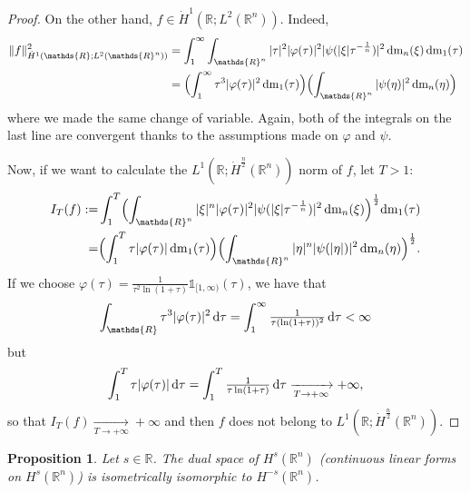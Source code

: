\documentclass[a4paper, 12pt]{article}
\theoremstyle{plain}
\newtheorem{proposition}{Proposition}[section]
\theoremstyle{definition}
\theoremstyle{remark}
\numberwithin{equation}{section}
\begin{document}
\begin{proof}
\noindent
On the other hand, $f\in \dot H^1({\mathds{R}};L^2({\mathds{R}}^n))$. Indeed,
%
\begin{align*}
\|f\|_{\dot H^1({\mathds{R}};L^2({\mathds{R}}^n))}^2&=
\int_1^\infty \int_{{\mathds{R}}^n} |\tau|^2|\varphi(\tau)|^2|\psi(|\xi|\tau^{-\frac{1}{n}})|^2\,{\rm dm}_n(\xi)\,{\rm dm}_1(\tau)\\
&=\Bigl(\int_1^\infty \tau^3 |\varphi(\tau)|^2\,{\rm dm}_1(\tau)\Bigr)\Bigl( \int_{{\mathds{R}}^n} |\psi(\eta)|^2\,{\rm dm}_n(\eta)\Bigr)
\end{align*}
% 
where we made the same change of variable. Again, both of the integrals on the last line are convergent thanks to the assumptions
made on $\varphi$ and $\psi$.

\noindent
Now, if we want to calculate the $L^1({\mathds{R}};\dot H^{\frac{n}{2}}({\mathds{R}}^n))$ norm of $f$, let $T>1$:
%
\begin{align*}
I_T(f):=&\int_1^T \Bigl(\int_{{\mathds{R}}^n}|\xi|^{n}|\varphi(\tau)|^2|\psi(|\xi|\tau^{-\frac{1}{n}})|^2\,{\rm dm}_n(\xi)\Bigr)^{\frac{1}{2}}{\rm dm}_1(\tau)\\
=&\Bigl(\int_1^T \tau|\varphi(\tau)|\,{\rm dm}_1(\tau)\Bigr)
\Bigl(\int_{{\mathds{R}}^n}|\eta|^{n}|\psi(|\eta|)|^2\,{\rm dm}_n(\eta)\Bigr)^{\frac{1}{2}}.
\end{align*}
%
If we choose $\varphi(\tau)=\frac{1}{\tau^2\ln(1+\tau)}{\mathds{1}}_{[1,\infty)}(\tau)$, we have that 
\[
\int_{{\mathds{R}}} \tau^3|\varphi(\tau)|^2\,{\rm d}\tau =\int_1^\infty \tfrac{1}{\tau (\ln(1+\tau))^2}\, {\rm d}\tau<\infty
\]
but
\[
\int_1^T \tau |\varphi(\tau)|\,{\rm d}\tau =\int_1^T\tfrac{1}{\tau \ln(1+\tau)}\,{\rm d}\tau\xrightarrow[T\to+\infty]{}+\infty,
\]
so that $I_T(f)\xrightarrow[T\to+\infty]{}+\infty$ and then $f$ does not belong to $L^1({\mathds{R}};\dot H^{\frac{n}{2}}({\mathds{R}}^n))$.
\end{proof}


\begin{proposition}
Let $s\in {\mathds{R}}$. The dual space of $H^s({\mathds{R}}^n)$ (continuous linear forms on $H^s({\mathds{R}}^n)$) is isometrically
isomorphic to $H^{-s}({\mathds{R}}^n)$.
\end{proposition}
\end{document}
